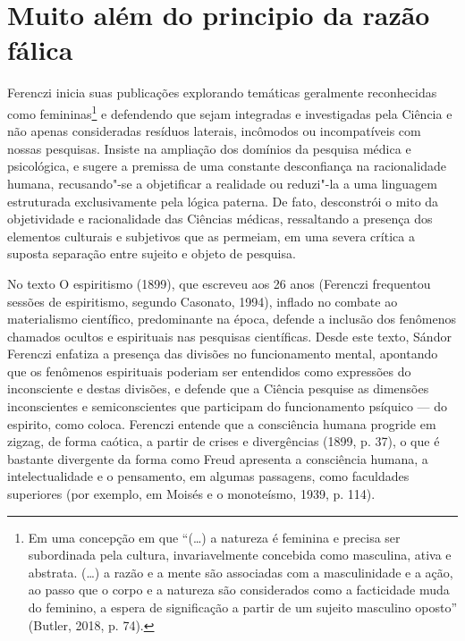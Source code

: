 \section{Muito além do principio da razão fálica }

Ferenczi inicia suas publicações explorando temáticas geralmente
reconhecidas como femininas\footnote{Em uma concepção em que ``(\ldots{}) a
  natureza é feminina e precisa ser subordinada pela cultura,
  invariavelmente concebida como masculina, ativa e abstrata. (\ldots{}) a
  razão e a mente são associadas com a masculinidade e a ação, ao passo
  que o corpo e a natureza são considerados como a facticidade muda do
  feminino, a espera de significação a partir de um sujeito masculino
  oposto'' (Butler, 2018, p. 74).} e defendendo que sejam integradas e
investigadas pela Ciência e não apenas consideradas resíduos laterais,
incômodos ou incompatíveis com nossas pesquisas. Insiste na ampliação
dos domínios da pesquisa médica e psicológica, e sugere a premissa de
uma constante desconfiança na racionalidade humana, recusando"-se a
objetificar a realidade ou reduzi"-la a uma linguagem estruturada
exclusivamente pela lógica paterna. De fato, desconstrói o mito da
objetividade e racionalidade das Ciências médicas, ressaltando a
presença dos elementos culturais e subjetivos que as permeiam, em uma
severa crítica a suposta separação entre sujeito e objeto de pesquisa.

No texto O espiritismo (1899), que escreveu aos 26 anos (Ferenczi
frequentou sessões de espiritismo, segundo Casonato, 1994), inflado no
combate ao materialismo científico, predominante na época, defende a
inclusão dos fenômenos chamados ocultos e espirituais nas pesquisas
científicas. Desde este texto, Sándor Ferenczi enfatiza a presença das
divisões no funcionamento mental, apontando que os fenômenos espirituais
poderiam ser entendidos como expressões do inconsciente e destas
divisões, e defende que a Ciência pesquise as dimensões inconscientes e
semiconscientes que participam do funcionamento psíquico --- do espirito,
como coloca. Ferenczi entende que a consciência humana progride em
zigzag, de forma caótica, a partir de crises e divergências (1899, p.
37), o que é bastante divergente da forma como Freud apresenta a
consciência humana, a intelectualidade e o pensamento, em algumas
passagens, como faculdades superiores (por exemplo, em Moisés e o
monoteísmo, 1939, p. 114).

